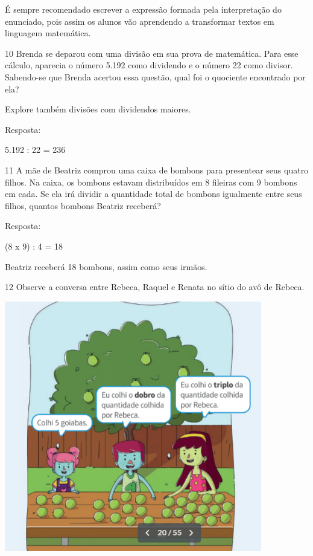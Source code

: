 \begin{escolha}
É sempre recomendado escrever a expressão formada pela interpretação do enunciado, pois assim os alunos vão aprendendo a transformar textos em linguagem
matemática.

\num{10} Brenda se deparou com uma divisão em sua prova de matemática. Para esse
cálculo, aparecia o número 5.192 como dividendo e o número 22 como divisor. Sabendo-se que
Brenda acertou essa questão, qual foi o quociente encontrado por ela?

Explore também divisões com dividendos maiores.


Resposta:

5.192 : 22 = 236

\num{11} A mãe de Beatriz comprou uma caixa de bombons para presentear seus
quatro filhos. Na caixa, os bombons estavam distribuídos em 8 fileiras
com 9 bombons em cada. Se ela irá dividir a quantidade total de bombons
igualmente entre seus filhos, quantos bombons Beatriz receberá?


Resposta:

(8 x 9) : 4 = 18 

Beatriz receberá 18 bombons, assim como seus irmãos.

\num{12} Observe a conversa entre Rebeca, Raquel e Renata no sítio do avô de Rebeca.

\includegraphics[width=4.42538in,height=4.30871in]{media/image24.png}


\end{escolha}
